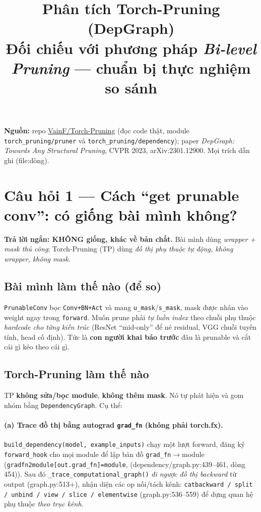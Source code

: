 \documentclass[11pt,a4paper]{article}
\title{\textbf{Phân tích Torch-Pruning (DepGraph)}\\
\large Đối chiếu với phương pháp \emph{Bi-level Pruning} --- chuẩn bị thực nghiệm so sánh}
\author{}
\date{}
\newcommand{\code}[1]{\texttt{#1}}
\newcommand{\src}[1]{{\small\ttfamily(#1)}}   %
\begin{document}
\maketitle
\vspace{-1.5em}

\noindent\textbf{Nguồn:} repo \href{https://github.com/VainF/Torch-Pruning}{VainF/Torch-Pruning}
(đọc code thật, module \code{torch\_pruning/pruner} và \code{torch\_pruning/dependency}); paper
\emph{DepGraph: Towards Any Structural Pruning}, CVPR 2023, arXiv:2301.12900. Mọi trích dẫn ghi
\src{file:dòng}.

\section{Câu hỏi 1 --- Cách ``get prunable conv'': có giống bài mình không?}

\noindent\textbf{Trả lời ngắn: KHÔNG giống, khác về bản chất.} Bài mình dùng \emph{wrapper +
mask thủ công}; Torch-Pruning (TP) dùng \emph{đồ thị phụ thuộc tự động, không wrapper, không mask}.

\subsection{Bài mình làm thế nào (để so)}
\code{PrunableConv} bọc \code{Conv+BN+Act} và mang \code{u\_mask}/\code{s\_mask}, mask được nhân vào
weight ngay trong \code{forward}. Muốn prune phải \emph{tự luồn index} theo chuỗi phụ thuộc
\emph{hardcode cho từng kiến trúc} (ResNet ``mid-only'' để né residual, VGG chuỗi tuyến tính, head cố
định). Tức là \textbf{con người khai báo trước} đâu là prunable và cắt cái gì kéo theo cái gì.

\subsection{Torch-Pruning làm thế nào}
TP \textbf{không sửa/bọc module}, \textbf{không thêm mask}. Nó tự phát hiện và gom nhóm bằng
\code{DependencyGraph}. Cụ thể:

\paragraph{(a) Trace đồ thị bằng autograd \code{grad\_fn} (không phải torch.fx).}
\code{build\_dependency(model, example\_inputs)} chạy một lượt forward, đăng ký \code{forward\_hook}
cho mọi module để lập bản đồ \code{grad\_fn}$\rightarrow$module
(\code{gradfn2module[out.grad\_fn]=module}, \src{dependency/graph.py:439--461, dòng 454}). Sau đó
\code{\_trace\_computational\_graph()} \emph{đi ngược đồ thị backward} từ output
\src{graph.py:513+}, nhận diện các op nối/tách kênh: \code{catbackward / split / unbind / view /
slice / elementwise} \src{graph.py:536--559} để dựng quan hệ phụ thuộc \emph{theo trục kênh}.
\end{document}
